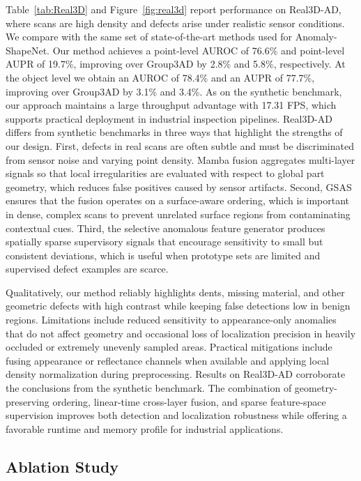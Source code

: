 Table~\ref{tab:Real3D} and Figure~\ref{fig:real3d} report performance on Real3D-AD, where scans are high density and defects arise under realistic sensor conditions. We compare with the same set of state-of-the-art methods used for Anomaly-ShapeNet. Our method achieves a point-level AUROC of 76.6\% and point-level AUPR of 19.7\%, improving over Group3AD by 2.8\% and 5.8\%, respectively. At the object level we obtain an AUROC of 78.4\% and an AUPR of 77.7\%, improving over Group3AD by 3.1\% and 3.4\%. As on the synthetic benchmark, our approach maintains a large throughput advantage with 17.31 FPS, which supports practical deployment in industrial inspection pipelines. Real3D-AD differs from synthetic benchmarks in three ways that highlight the strengths of our design. First, defects in real scans are often subtle and must be discriminated from sensor noise and varying point density. Mamba fusion aggregates multi-layer signals so that local irregularities are evaluated with respect to global part geometry, which reduces false positives caused by sensor artifacts. Second, GSAS ensures that the fusion operates on a surface-aware ordering, which is important in dense, complex scans to prevent unrelated surface regions from contaminating contextual cues. Third, the selective anomalous feature generator produces spatially sparse supervisory signals that encourage sensitivity to small but consistent deviations, which is useful when prototype sets are limited and supervised defect examples are scarce.

Qualitatively, our method reliably highlights dents, missing material, and other geometric defects with high contrast while keeping false detections low in benign regions. Limitations include reduced sensitivity to appearance-only anomalies that do not affect geometry and occasional loss of localization precision in heavily occluded or extremely unevenly sampled areas. Practical mitigations include fusing appearance or reflectance channels when available and applying local density normalization during preprocessing. Results on Real3D-AD corroborate the conclusions from the synthetic benchmark. The combination of geometry-preserving ordering, linear-time cross-layer fusion, and sparse feature-space supervision improves both detection and localization robustness while offering a favorable runtime and memory profile for industrial applications.

\subsection{Ablation Study}

